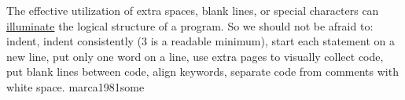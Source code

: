 \documentclass{article}
\begin{document}
  {The effective utilization of extra spaces, blank lines, or special characters can \ul{illuminate} the logical structure of a program. So we should not be afraid to: indent, indent consistently (3 is a readable minimum), start each statement on a new line, put only one word on a line, use extra pages to visually collect code, put blank lines between code, align keywords, separate code from comments with white space.}
  {marca1981some}
\end{document}
